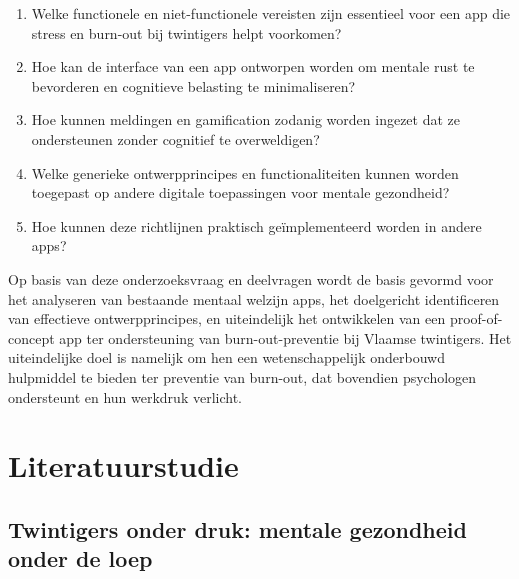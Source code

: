 \begin{enumerate}
    \item Welke functionele en niet-functionele vereisten zijn essentieel voor een app die stress en burn-out bij twintigers helpt voorkomen?
    
    \item Hoe kan de interface van een app ontworpen worden om mentale rust te bevorderen en cognitieve belasting te minimaliseren?
    \item Hoe kunnen meldingen en gamification zodanig worden ingezet dat ze ondersteunen zonder cognitief te overweldigen?
    
    \item Welke generieke ontwerpprincipes en functionaliteiten kunnen worden toegepast op andere digitale toepassingen voor mentale gezondheid?
    \item Hoe kunnen deze richtlijnen praktisch geïmplementeerd worden in andere apps?
\end{enumerate}

\vspace{1em}

Op basis van deze onderzoeksvraag en deelvragen wordt de basis gevormd voor het analyseren van bestaande mentaal welzijn apps, het doelgericht identificeren van effectieve ontwerpprincipes, en uiteindelijk het ontwikkelen van een proof-of-concept app ter ondersteuning van burn-out-preventie bij Vlaamse twintigers. Het uiteindelijke doel is namelijk om hen een wetenschappelijk onderbouwd hulpmiddel te bieden ter preventie van burn-out, dat bovendien psychologen ondersteunt en hun werkdruk verlicht.

\vspace{1em}



\section{Literatuurstudie}%
\label{sec:literatuurstudie}

\vspace{1em}

\subsection{Twintigers onder druk: \newline mentale gezondheid onder de loep}%
\label{subsec:twintigers_gezondheid}

